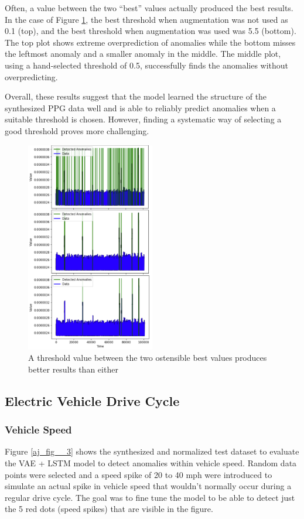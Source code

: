 \documentclass[conference]{IEEEtran}
\begin{document}
Often, a value between the two “best” values actually produced the best results. In the case of Figure \ref{ck_fig_4}, the best threshold when augmentation was not used as 0.1 (top), and the best threshold when augmentation was used was 5.5 (bottom). The top plot shows extreme overprediction of anomalies while the bottom misses the leftmost anomaly and a smaller anomaly in the middle. The middle plot, using a hand-selected threshold of 0.5, successfully finds the anomalies without overpredicting.

Overall, these results suggest that the model learned the structure of the synthesized PPG data well and is able to reliably predict anomalies when a suitable threshold is chosen. However, finding a systematic way of selecting a good threshold proves more challenging.

\begin{figure}[htbp]
    \centering
    \includegraphics[width=0.5\textwidth]{ck_fig_4.png}
    \caption{A threshold value between the two ostensible best values produces better results than either}
    \label{ck_fig_4}
\end{figure}

\subsection{Electric Vehicle Drive Cycle}
\subsubsection{Vehicle Speed}
Figure \ref{aj_fig__3} shows the synthesized and normalized test dataset to evaluate the VAE + LSTM model to detect anomalies within vehicle speed. Random data points were selected and a speed spike of 20 to 40 mph were introduced to simulate an actual spike in vehicle speed that wouldn’t normally occur during a regular drive cycle. The goal was to fine tune the model to be able to detect just the 5 red dots (speed spikes) that are visible in the figure.
\end{document}
